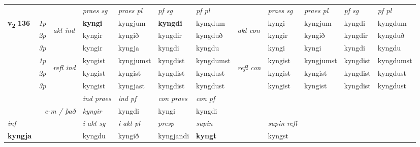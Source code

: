 \begin{longtable}[l]{X>{\footnotesize\itshape}llXXXXlXXXX}
 & &   & \textit{praes sg}  & \textit{praes pl}    & \textit{ pf sg} & \textit{pf pl} & & \textit{praes sg}  & \textit{praes pl}    & \textit{pf sg} & \textit{pf pl }  \\ \cmidrule{4-7} \cmidrule{9-12}
 \multirow{2}{*}{{{\textbf{v{\textsubscript{2}}} \Large{\textbf{136}}}}}  & 1p & \multirow{3}{*}{\begin{turn}{90}\textit{akt ind}\end{turn}} & \textbf{kyngi} & kyngjum & \textbf{kyngdi} & kyngdum & \multirow{3}{*}{\begin{turn}{90}\textit{akt con}\end{turn}} &kyngi & kyngjum & kyngdi & kyngdum\\*
 & 2p &  &  kyngir  & kyngið & kyngdir & kyngduð & & kyngir & kyngið & kyngdir & kyngduð \\*
 & 3p &  & kyngir & kyngja & kyngdi & kyngdu & & kyngi & kyngi& kyngdi & kyngdu \\*
\cmidrule{4-7} \cmidrule{9-12}
 & 1p & \multirow{3}{*}{\begin{turn}{90}\textit{refl ind}\end{turn}}  & kyngist & kyngjumst & kyngdist & kyngdumst & \multirow{3}{*}{\begin{turn}{90}\textit{refl con}\end{turn}}  &kyngist & kyngjumst & kyngdist & kyngdumst \\*
 & 2p &  & kyngist & kyngist & kyngdist & kyngdust & &kyngist & kyngist & kyngdist & kyngdust \\*
 & 3p  & & kyngist & kyngjast & kyngdist & kyngdust & & kyngist & kyngist& kyngdist & kyngdust \\*
\cmidrule{4-7} \cmidrule{9-12}

   && &  \textit{ind praes} & \textit{ind pf} & \textit{con praes} & \textit{con pf} \\*
\multicolumn{3}{r}{\textit{e-m / það}} & kyngir & kyngdi & kyngi & kyngdi \\*

\cmidrule{4-7}
   {\textit{inf}} & &  & \textit{i akt sg} & \textit{i akt pl}   & \textit{presp} & \textit{supin} && \textit{supin refl}  \\*
  {\textbf{kyngja}} & && kyngdu  & kyngið   & kyngjandi &  \textbf{kyngt} && kyngst  \\*

\midrule


\end{longtable}
